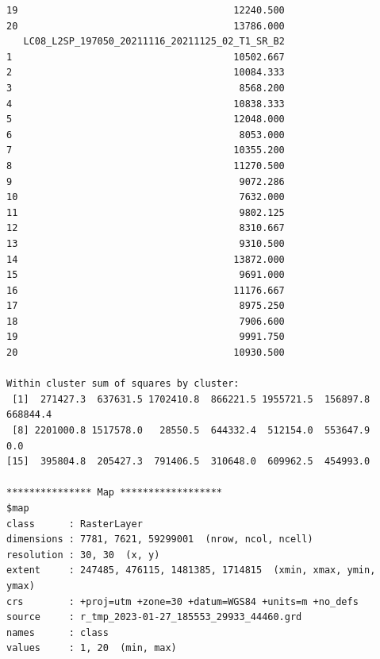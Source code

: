 \documentclass[remotesensing,article,submit,pdftex,moreauthors]{Definitions/mdpi}
\begin{document}
\begin{scriptsize}
\begin{verbatim}
19                                      12240.500
20                                      13786.000
   LC08_L2SP_197050_20211116_20211125_02_T1_SR_B2
1                                       10502.667
2                                       10084.333
3                                        8568.200
4                                       10838.333
5                                       12048.000
6                                        8053.000
7                                       10355.200
8                                       11270.500
9                                        9072.286
10                                       7632.000
11                                       9802.125
12                                       8310.667
13                                       9310.500
14                                      13872.000
15                                       9691.000
16                                      11176.667
17                                       8975.250
18                                       7906.600
19                                       9991.750
20                                      10930.500

Within cluster sum of squares by cluster:
 [1]  271427.3  637631.5 1702410.8  866221.5 1955721.5  156897.8  668844.4
 [8] 2201000.8 1517578.0   28550.5  644332.4  512154.0  553647.9       0.0
[15]  395804.8  205427.3  791406.5  310648.0  609962.5  454993.0

*************** Map ******************
$map
class      : RasterLayer 
dimensions : 7781, 7621, 59299001  (nrow, ncol, ncell)
resolution : 30, 30  (x, y)
extent     : 247485, 476115, 1481385, 1714815  (xmin, xmax, ymin, ymax)
crs        : +proj=utm +zone=30 +datum=WGS84 +units=m +no_defs 
source     : r_tmp_2023-01-27_185553_29933_44460.grd 
names      : class 
values     : 1, 20  (min, max)
\end{verbatim}
\end{scriptsize}
\end{document}
